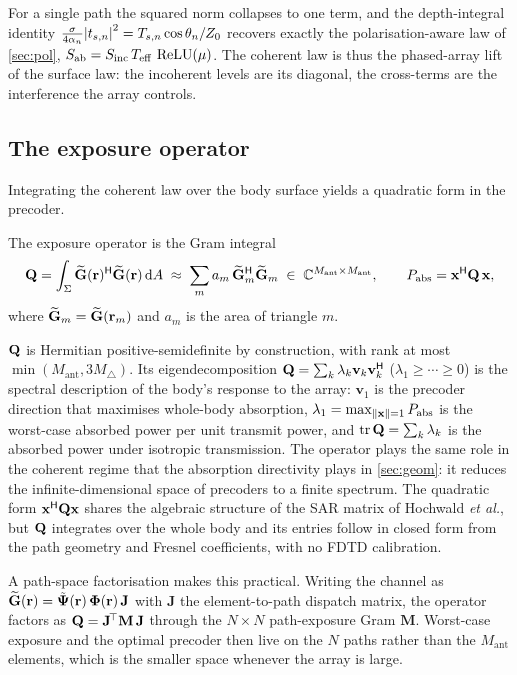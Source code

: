 For a single path the squared norm collapses to one term, and the
depth-integral identity $\frac{\sigma}{4\alpha_n}\abs{t_{s,n}}^2
=T_{s,n}\cos\theta_n/Z_0$ recovers exactly the polarisation-aware law of
\cref{sec:pol}, $S_{\mathrm{ab}}=S_{\mathrm{inc}}\,T_{\mathrm{eff}}\,\operatorname{ReLU}(\mu)$. The coherent law is
thus the phased-array lift of the surface law: the incoherent levels are
its diagonal, the cross-terms are the interference the array controls.

\subsection{The exposure operator}

Integrating the coherent law over the body surface yields a quadratic
form in the precoder.

\begin{definition}\label{def:Q}
The exposure operator is the Gram integral
\begin{equation}\label{eq:Q-def}
  \mathbf{Q}=\int_\Sigma \widetilde{\mathbf{G}}(\mathbf{r})^{\mathsf{H}}\widetilde{\mathbf{G}}(\mathbf{r})\,\mathrm{d} A
     \;\approx\;\sum_m a_m\,\widetilde{\mathbf{G}}_m^{\mathsf{H}}\widetilde{\mathbf{G}}_m
     \;\in\;\mathbb{C}^{M_{\mathrm{ant}}\times M_{\mathrm{ant}}},
  \qquad
  P_{\mathrm{abs}}=\mathbf{x}^{\mathsf{H}}\mathbf{Q}\,\mathbf{x},
\end{equation}
where $\widetilde{\mathbf{G}}_m=\widetilde{\mathbf{G}}(\mathbf{r}_m)$ and $a_m$ is the area of triangle $m$.
\end{definition}

$\mathbf{Q}$ is Hermitian positive-semidefinite by construction, with rank at
most $\min(M_{\mathrm{ant}},3M_\triangle)$. Its eigendecomposition
$\mathbf{Q}=\sum_k\lambda_k\mathbf v_k\mathbf v_k^{\mathsf{H}}$
($\lambda_1\ge\cdots\ge 0$) is the spectral description of the body's
response to the array: $\mathbf v_1$ is the precoder direction that
maximises whole-body absorption,
$\lambda_1=\max_{\norm{\mathbf{x}}=1}P_{\mathrm{abs}}$ is the worst-case absorbed
power per unit transmit power, and $\operatorname{tr}\mathbf{Q}=\sum_k\lambda_k$
is the absorbed power under isotropic transmission. The operator plays
the same role in the coherent regime that the absorption directivity
plays in \cref{sec:geom}: it reduces the infinite-dimensional space
of precoders to a finite spectrum. The quadratic form
$\mathbf{x}^{\mathsf{H}}\mathbf{Q}\mathbf{x}$ shares the algebraic structure of the SAR matrix of
Hochwald \emph{et al.}, but $\mathbf{Q}$ integrates over the whole body and
its entries follow in closed form from the path geometry and Fresnel
coefficients, with no FDTD calibration.

A path-space factorisation makes this practical. Writing the channel as
$\widetilde{\mathbf{G}}(\mathbf{r})=\tilde{\boldsymbol\Psi}(\mathbf{r})\,\boldsymbol\Phi(\mathbf{r})\,\mathbf J$
with $\mathbf J$ the element-to-path dispatch matrix, the operator
factors as $\mathbf{Q}=\mathbf J^{\!\top}\mathbf M\,\mathbf J$ through the
$N\times N$ path-exposure Gram $\mathbf M$. Worst-case exposure and the
optimal precoder then live on the $N$ paths rather than the
$M_{\mathrm{ant}}$ elements, which is the smaller space whenever the
array is large.

